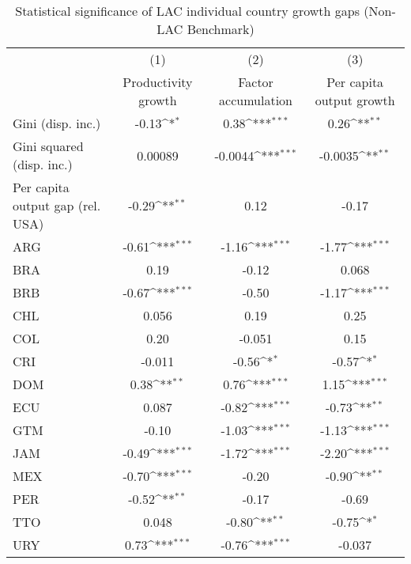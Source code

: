 \begin{table}[htbp]\centering
\def\sym#1{\ifmmode^{#1}\else\(^{#1}\)\fi}
\caption{Statistical significance of LAC individual country growth gaps (Non-LAC Benchmark)}
\begin{tabular}{l*{3}{c}}
\toprule
                &\multicolumn{1}{c}{(1)}&\multicolumn{1}{c}{(2)}&\multicolumn{1}{c}{(3)}\\
                &\multicolumn{1}{c}{Productivity growth}&\multicolumn{1}{c}{Factor accumulation}&\multicolumn{1}{c}{Per capita output growth}\\
\midrule
Gini (disp. inc.)&    -0.13\sym{*}  &     0.38\sym{***}&     0.26\sym{**} \\
Gini squared (disp. inc.)&  0.00089         &  -0.0044\sym{***}&  -0.0035\sym{**} \\
Per capita output gap (rel. USA)&    -0.29\sym{**} &     0.12         &    -0.17         \\
ARG             &    -0.61\sym{***}&    -1.16\sym{***}&    -1.77\sym{***}\\
BRA             &     0.19         &    -0.12         &    0.068         \\
BRB             &    -0.67\sym{***}&    -0.50         &    -1.17\sym{***}\\
CHL             &    0.056         &     0.19         &     0.25         \\
COL             &     0.20         &   -0.051         &     0.15         \\
CRI             &   -0.011         &    -0.56\sym{*}  &    -0.57\sym{*}  \\
DOM             &     0.38\sym{**} &     0.76\sym{***}&     1.15\sym{***}\\
ECU             &    0.087         &    -0.82\sym{***}&    -0.73\sym{**} \\
GTM             &    -0.10         &    -1.03\sym{***}&    -1.13\sym{***}\\
JAM             &    -0.49\sym{***}&    -1.72\sym{***}&    -2.20\sym{***}\\
MEX             &    -0.70\sym{***}&    -0.20         &    -0.90\sym{**} \\
PER             &    -0.52\sym{**} &    -0.17         &    -0.69         \\
TTO             &    0.048         &    -0.80\sym{**} &    -0.75\sym{*}  \\
URY             &     0.73\sym{***}&    -0.76\sym{***}&   -0.037         \\

\end{tabular}
\end{table}
